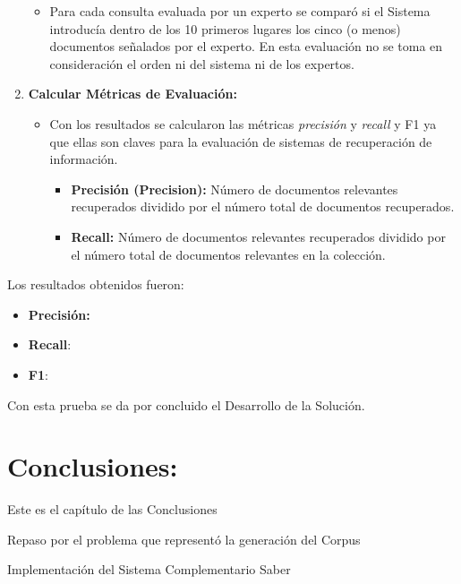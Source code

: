 \documentclass[
  12pt,
  openany]{book}
\providecommand{\tightlist}{%
  \setlength{\itemsep}{0pt}\setlength{\parskip}{0pt}}
\begin{document}
\begin{enumerate}
  \begin{itemize}
  \tightlist
  \item
    Para cada consulta evaluada por un experto se comparó si el Sistema introducía dentro de los 10 primeros lugares los cinco (o menos) documentos señalados por el experto. En esta evaluación no se toma en consideración el orden ni del sistema ni de los expertos.
  \end{itemize}
\item
  \textbf{Calcular Métricas de Evaluación:}

  \begin{itemize}
  \tightlist
  \item
    Con los resultados se calcularon las métricas \emph{precisión} y \emph{recall} y F1 ya que ellas son claves para la evaluación de sistemas de recuperación de información.

    \begin{itemize}
    \tightlist
    \item
      \textbf{Precisión (Precision):} Número de documentos relevantes recuperados dividido por el número total de documentos recuperados.
    \item
      \textbf{Recall:} Número de documentos relevantes recuperados dividido por el número total de documentos relevantes en la colección.
    \end{itemize}
  \end{itemize}
\end{enumerate}

Los resultados obtenidos fueron:

\begin{itemize}
\item
  \textbf{Precisión:}
\item
  \textbf{Recall}:
\item
  \textbf{F1}:
\end{itemize}

Con esta prueba se da por concluido el Desarrollo de la Solución.

\hypertarget{conclusiones}{%
\chapter{Conclusiones:}\label{conclusiones}}

Este es el capítulo de las Conclusiones

Repaso por el problema que representó la generación del Corpus

Implementación del Sistema Complementario Saber
\end{document}

